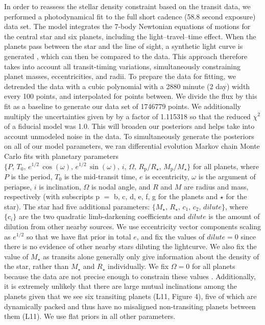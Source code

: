 \documentclass[oneside]{emulateapj}
\begin{document}
In order to reassess the stellar density constraint based on the transit data, we performed a photodynamical fit to the full \Kepler short cadence (58.8 second exposure) data set. The model integrates the 7-body Newtonian equations of motions for the central star and six planets, including the light--travel--time effect. When the planets pass between the star and the line of sight, a synthetic light curve is generated \citep{2012MNRAS.420.1630P}, which can then be compared to the data. This approach therefore takes into account all transit-timing variations, simultaneously constraining planet masses, eccentricities, and radii. To prepare the data for fitting, we detrended the data with a cubic polynomial with a 2880 minute (2 day) width every 100 points, and interpolated for points between. We divide the flux by this fit as a baseline to generate our data set of 1746779 points. We additionally multiply the uncertainties given by \Kepler by a factor of 1.115318 so that the reduced $\chi^2$ of a fiducial model was 1.0. This will broaden our posteriors and helps take into account unmodeled noise in the data. To simultaneously generate the posteriors on all of our model parameters, we ran differential evolution Markov chain Monte Carlo \cite[DEMCMC, ][]{TerBraak2005} fits with planetary parameters $\{P,\, T_0,\, e^{1/2} \, \cos(\omega),\, e^{1/2} \, \sin(\omega),\, i,\, \Omega,\, R_\mathrm{p}/R_\star,\, M_\mathrm{p}/M_\star\}$ for all planets, where $P$ is the period, $T_0$ is the mid-transit time, $e$ is eccentricity, $\omega$ is the argument of periapse, $i$ is inclination, $\Omega$ is nodal angle, and $R$ and $M$ are radius and mass, respectively (with subscripts p $=$ b, c, d, e, f, g for the planets and $\star$ for the star). The star had five additional parameters: $\{M_\star,\, R_\star,\, c_1,\, c_2,\, dilute\}$, where $\{c_i\}$ are the two quadratic limb-darkening coefficients and $dilute$ is the amount of dilution from other nearby sources. We use eccentricity vector components scaling as $e^{1/2}$ so that we have flat prior in total $e$, and fix the values of $dilute=0$ since there is no evidence of other nearby stars diluting the lightcurve. We also fix the value of $M_\star$ as transits alone generally only give information about the density of the star, rather than $M_\star$ and $R_\star$ individually. We fix $\Omega = 0$ for all planets because the data are not precise enough to constrain these values \citep{Migaszewski2012}. Additionally, it is extremely unlikely that there are large mutual inclinations among the planets given that we see six transiting planets (L11, Figure 4), five of which are dynamically packed and thus have no misaligned non-transiting planets between them (L11). We use flat priors in all other parameters.
\end{document}
